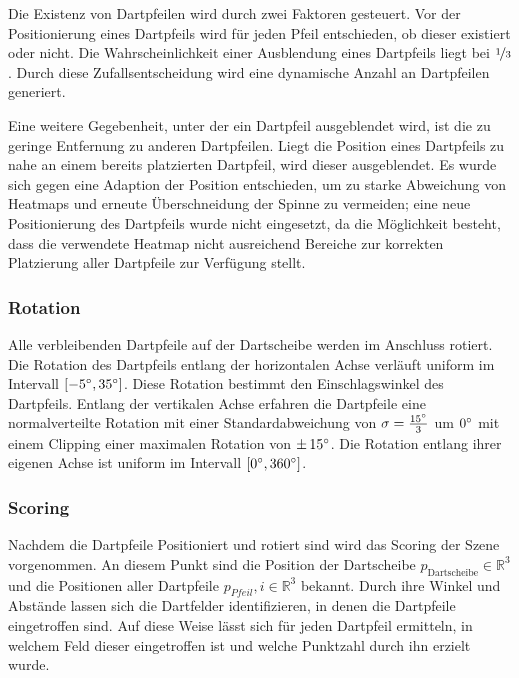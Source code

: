 Die Existenz von Dartpfeilen wird durch zwei Faktoren gesteuert. Vor der Positionierung eines Dartpfeils wird für jeden Pfeil entschieden, ob dieser existiert oder nicht. Die Wahrscheinlichkeit einer Ausblendung eines Dartpfeils liegt bei $\nicefrac{1}{3}$. Durch diese Zufallsentscheidung wird eine dynamische Anzahl an Dartpfeilen generiert.

Eine weitere Gegebenheit, unter der ein Dartpfeil ausgeblendet wird, ist die zu geringe Entfernung zu anderen Dartpfeilen. Liegt die Position eines Dartpfeils zu nahe an einem bereits platzierten Dartpfeil, wird dieser ausgeblendet. Es wurde sich gegen eine Adaption der Position entschieden, um zu starke Abweichung von Heatmaps und erneute Überschneidung der Spinne zu vermeiden; eine neue Positionierung des Dartpfeils wurde nicht eingesetzt, da die Möglichkeit besteht, dass die verwendete Heatmap nicht ausreichend Bereiche zur korrekten Platzierung aller Dartpfeile zur Verfügung stellt.

\subsubsection{Rotation}

Alle verbleibenden Dartpfeile auf der Dartscheibe werden im Anschluss rotiert. Die Rotation des Dartpfeils entlang der horizontalen Achse verläuft uniform im Intervall $[-5^{\circ}, 35^{\circ}]$. Diese Rotation bestimmt den Einschlagswinkel des Dartpfeils. Entlang der vertikalen Achse erfahren die Dartpfeile eine normalverteilte Rotation mit einer Standardabweichung von $\sigma = \frac{15^{\circ}}{3}$ um $0^{\circ}$ mit einem Clipping einer maximalen Rotation von $\pm\,15^{\circ}$. Die Rotation entlang ihrer eigenen Achse ist uniform im Intervall $[0^{\circ}, 360^{\circ}]$.

\subsubsection{Scoring}

Nachdem die Dartpfeile Positioniert und rotiert sind wird das Scoring der Szene vorgenommen. An diesem Punkt sind die Position der Dartscheibe $p_\text{Dartscheibe} \in \mathbb{R}^3$ und die Positionen aller Dartpfeile $p_{Pfeil}, i \in \mathbb{R}^3$ bekannt. Durch ihre Winkel und Abstände lassen sich die Dartfelder identifizieren, in denen die Dartpfeile eingetroffen sind. Auf diese Weise lässt sich für jeden Dartpfeil ermitteln, in welchem Feld dieser eingetroffen ist und welche Punktzahl durch ihn erzielt wurde.

